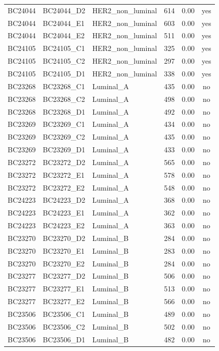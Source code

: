 \begin{longtable}{lllccc}
BC24044 & BC24044\_D2 & HER2\_non\_luminal & 614 & 0.00 & yes \\
BC24044 & BC24044\_E1 & HER2\_non\_luminal & 603 & 0.00 & yes \\
BC24044 & BC24044\_E2 & HER2\_non\_luminal & 511 & 0.00 & yes \\
BC24105 & BC24105\_C1 & HER2\_non\_luminal & 325 & 0.00 & yes \\
BC24105 & BC24105\_C2 & HER2\_non\_luminal & 297 & 0.00 & yes \\
BC24105 & BC24105\_D1 & HER2\_non\_luminal & 338 & 0.00 & yes \\
BC23268 & BC23268\_C1 & Luminal\_A & 435 & 0.00 & no \\
BC23268 & BC23268\_C2 & Luminal\_A & 498 & 0.00 & no \\
BC23268 & BC23268\_D1 & Luminal\_A & 492 & 0.00 & no \\
BC23269 & BC23269\_C1 & Luminal\_A & 434 & 0.00 & no \\
BC23269 & BC23269\_C2 & Luminal\_A & 435 & 0.00 & no \\
BC23269 & BC23269\_D1 & Luminal\_A & 433 & 0.00 & no \\
BC23272 & BC23272\_D2 & Luminal\_A & 565 & 0.00 & no \\
BC23272 & BC23272\_E1 & Luminal\_A & 578 & 0.00 & no \\
BC23272 & BC23272\_E2 & Luminal\_A & 548 & 0.00 & no \\
BC24223 & BC24223\_D2 & Luminal\_A & 368 & 0.00 & no \\
BC24223 & BC24223\_E1 & Luminal\_A & 362 & 0.00 & no \\
BC24223 & BC24223\_E2 & Luminal\_A & 363 & 0.00 & no \\
BC23270 & BC23270\_D2 & Luminal\_B & 284 & 0.00 & no \\
BC23270 & BC23270\_E1 & Luminal\_B & 283 & 0.00 & no \\
BC23270 & BC23270\_E2 & Luminal\_B & 284 & 0.00 & no \\
BC23277 & BC23277\_D2 & Luminal\_B & 506 & 0.00 & no \\
BC23277 & BC23277\_E1 & Luminal\_B & 513 & 0.00 & no \\
BC23277 & BC23277\_E2 & Luminal\_B & 566 & 0.00 & no \\
BC23506 & BC23506\_C1 & Luminal\_B & 489 & 0.00 & no \\
BC23506 & BC23506\_C2 & Luminal\_B & 502 & 0.00 & no \\
BC23506 & BC23506\_D1 & Luminal\_B & 482 & 0.00 & no \\

\end{longtable}

